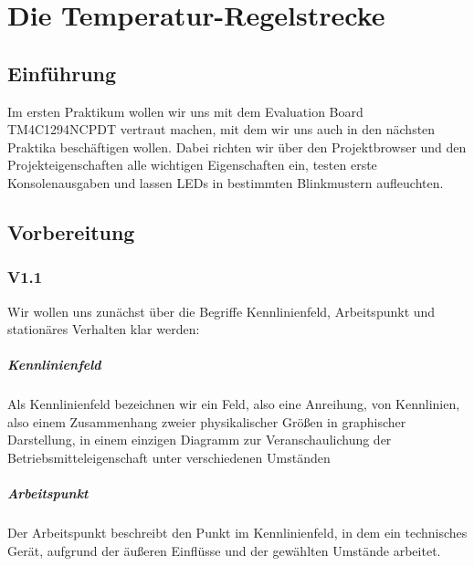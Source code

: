 \documentclass{report}
\begin{document}
\newpage


\tableofcontents

\listoffigures

\lstlistoflistings

\newpage

\chapter{Die Temperatur-Regelstrecke}

\section{Einführung}

Im ersten Praktikum wollen wir uns mit dem Evaluation Board TM4C1294NCPDT vertraut machen,
mit dem wir uns auch in den nächsten Praktika beschäftigen wollen. Dabei richten wir
über den Projektbrowser und den Projekteigenschaften alle wichtigen Eigenschaften ein,
testen erste Konsolenausgaben und lassen LEDs in bestimmten Blinkmustern aufleuchten.


\section{Vorbereitung}

\subsection{V1.1}

Wir wollen uns zunächst über die Begriffe Kennlinienfeld, Arbeitspunkt und stationäres Verhalten klar werden:

\paragraph{Kennlinienfeld} Als Kennlinienfeld bezeichnen wir ein Feld, also eine Anreihung, von Kennlinien, also einem Zusammenhang zweier physikalischer Größen in graphischer Darstellung,
in einem einzigen Diagramm zur Veranschaulichung der Betriebsmitteleigenschaft unter verschiedenen Umständen

\paragraph{Arbeitspunkt} Der Arbeitspunkt beschreibt den Punkt im Kennlinienfeld, in dem ein technisches Gerät, aufgrund der äußeren Einflüsse und der gewählten Umstände arbeitet.
\end{document}
